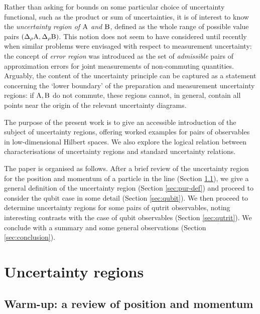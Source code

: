 Rather than asking for bounds on some particular choice of uncertainty functional, such as the product or sum of uncertainties, it is of interest to know the \emph{uncertainty region of $\operatorname{A}$ and $\operatorname{B}$}, defined as the whole range of possible value pairs $(\sdevr{\opa},\sdevr{\opb})$. This notion does not seem to have considered until recently when similar problems were envisaged with respect to measurement uncertainty\cite{werner-ang-mom,li-refomulating-uncertainty-principle,zhang-etal-stronger-ur,busch-bullock-qubit}: the concept of {\em error region} was introduced as the set of {\em admissible} pairs of approximation errors for joint measurements of non-commuting quantities\cite{busch-heinosaari-qubit}. Arguably, the content of the uncertainty principle can be captured as a statement concerning the `lower boundary' of the preparation and measurement uncertainty regions:
if $\operatorname{A},\operatorname{B}$ do not commute, these regions cannot, in general, contain all points near the origin of the relevant uncertainty diagrams.

The purpose of the present work is to give an accessible introduction of the subject of uncertainty regions, offering worked examples for pairs of observables in low-dimensional Hilbert spaces. We also explore the logical relation between characterisations of uncertainty regions and standard uncertainty relations.

The  paper is organised as follows. After a brief review of the uncertainty region for the position and momentum of a particle in the line (Section \ref{sec:qp}), we give a general definition of the uncertainty region (Section \ref{sec:pur-def}) and proceed to consider the qubit case in some detail (Section \ref{sec:qubit}). We then proceed to determine uncertainty regions for some pairs of qutrit observables, noting interesting contrasts with the case of qubit observables (Section \ref{sec:qutrit}). We conclude with a summary and some general observations (Section \ref{sec:conclusion}).

\section{Uncertainty regions}

\subsection{Warm-up: a review of position and momentum}\label{sec:qp}

